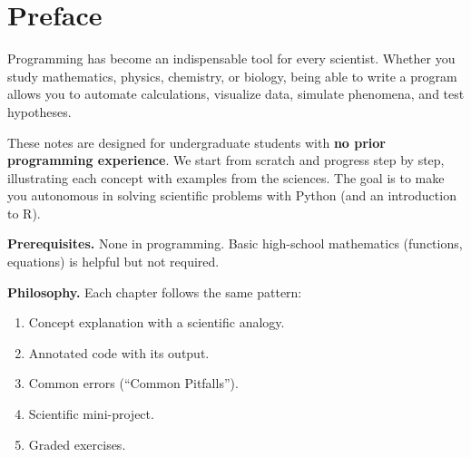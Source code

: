 \documentclass[12pt,a4paper,twoside]{book}
\theoremstyle{definition}
\theoremstyle{remark}
\begin{document}
\frontmatter
\begin{titlepage}
\end{titlepage}
\tableofcontents

\chapter*{Preface}

Programming has become an indispensable tool for every scientist. Whether you study mathematics, physics, chemistry, or biology, being able to write a program allows you to automate calculations, visualize data, simulate phenomena, and test hypotheses.

\medskip
These notes are designed for undergraduate students with \textbf{no prior programming experience}. We start from scratch and progress step by step, illustrating each concept with examples from the sciences. The goal is to make you autonomous in solving scientific problems with Python (and an introduction to R).

\medskip
\textbf{Prerequisites.} None in programming. Basic high-school mathematics (functions, equations) is helpful but not required.

\medskip
\textbf{Philosophy.} Each chapter follows the same pattern:
\begin{enumerate}
\item Concept explanation with a scientific analogy.
\item Annotated code with its output.
\item Common errors (``Common Pitfalls'').
\item Scientific mini-project.
\item Graded exercises.
\end{enumerate}
\end{document}
